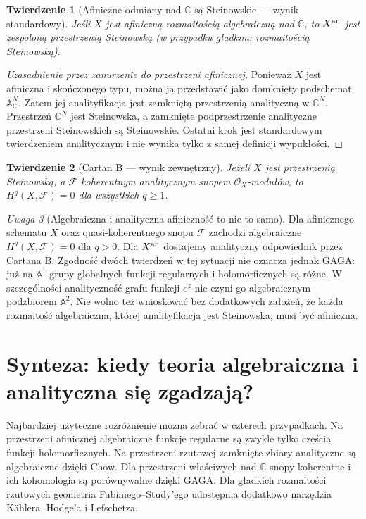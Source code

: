 \documentclass[11pt,a4paper,openany]{report}
\numberwithin{equation}{section}
\theoremstyle{plain}
\newtheorem{twierdzenie}{Twierdzenie}[section]
\theoremstyle{definition}
\theoremstyle{remark}
\newtheorem{uwaga}[twierdzenie]{Uwaga}
\newcommand{\C}{\mathbb C}
\newcommand{\A}{\mathbb A}
\begin{document}
\begin{twierdzenie}[Afiniczne odmiany nad $\C$ są Steinowskie — wynik standardowy]
\label{tw:ga9-affine-stein}
Jeśli $X$ jest afiniczną rozmaitością algebraiczną
nad $\C$, to $X^{\rm an}$ jest zespoloną
przestrzenią Steinowską (w przypadku gładkim:
rozmaitością Steinowską).
\end{twierdzenie}
\begin{proof}[Uzasadnienie przez zanurzenie do przestrzeni afinicznej]
Ponieważ $X$ jest afiniczna i skończonego typu,
można ją przedstawić jako domknięty podschemat
$\A^N_\C$. Zatem jej analityfikacja jest
zamkniętą przestrzenią analityczną w $\C^N$.
Przestrzeń $\C^N$ jest Steinowska, a zamknięte
podprzestrzenie analityczne przestrzeni Steinowskich
są Steinowskie. Ostatni krok jest standardowym
twierdzeniem analitycznym i nie wynika tylko
z samej definicji wypukłości.
\end{proof}

\begin{twierdzenie}[Cartan B — wynik zewnętrzny]
Jeżeli $X$ jest przestrzenią Steinowską,
a $\mathcal F$ koherentnym analitycznym snopem
$\mathcal O_X$-modułów, to
$H^q(X,\mathcal F)=0$ dla wszystkich $q\ge1$.
\end{twierdzenie}

\begin{uwaga}[Algebraiczna i analityczna afiniczność to nie to samo]
Dla afinicznego schematu $X$ oraz quasi-koherentnego
snopu $\mathcal F$ zachodzi algebraiczne
$H^q(X,\mathcal F)=0$ dla $q>0$. Dla $X^{\rm an}$
dostajemy analityczny odpowiednik przez Cartana B.
Zgodność dwóch twierdzeń w tej sytuacji nie oznacza
jednak GAGA: już na $\A^1$ grupy globalnych funkcji
regularnych i holomorficznych są różne.
W szczególności analityczność grafu funkcji $e^z$
nie czyni go algebraicznym podzbiorem $\A^2$.
Nie wolno też wnioskować bez dodatkowych założeń,
że każda rozmaitość algebraiczna, której analityfikacja
jest Steinowska, musi być afiniczna.
\end{uwaga}

\section{Synteza: kiedy teoria algebraiczna i analityczna się zgadzają?}
\label{sec:ga9-podsumowanie}

Najbardziej użyteczne rozróżnienie można zebrać
w czterech przypadkach. Na przestrzeni afinicznej
algebraiczne funkcje regularne są zwykle tylko częścią
funkcji holomorficznych. Na przestrzeni rzutowej
zamknięte zbiory analityczne są algebraiczne dzięki
Chow. Dla przestrzeni właściwych nad $\C$ snopy
koherentne i ich kohomologia są porównywalne dzięki
GAGA. Dla gładkich rozmaitości rzutowych geometria
Fubiniego--Study'ego udostępnia dodatkowo narzędzia
Kählera, Hodge'a i Lefschetza.
\end{document}
